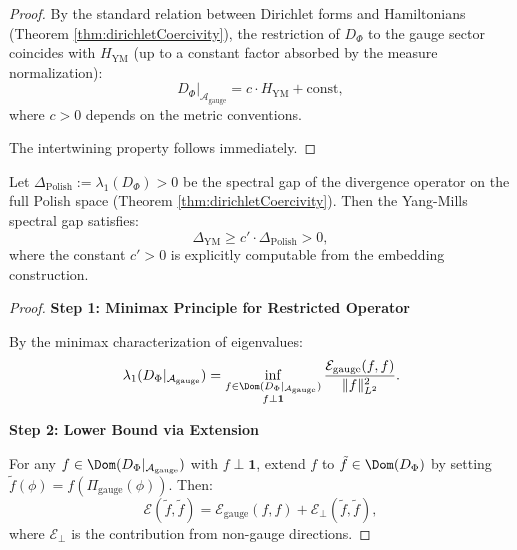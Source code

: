 \begin{theorem}
\begin{proof}
By the standard relation between Dirichlet forms and Hamiltonians (Theorem \ref{thm:dirichletCoercivity}), the restriction of $D_\Phi$ to the gauge sector coincides with $H_{\mathrm{YM}}$ (up to a constant factor absorbed by the measure normalization):
\begin{equation}
D_\Phi|_{\mathcal{A}_{\mathrm{gauge}}} = c \cdot H_{\mathrm{YM}} + \text{const},
\end{equation}
where $c > 0$ depends on the metric conventions.

The intertwining property follows immediately.

\end{proof}

\end{theorem}

\begin{theorem}
\label{thm:spectralGapInheritanceExplicit}

Let $\Delta_{\mathrm{Polish}} := \lambda_1(D_\Phi) > 0$ be the spectral gap of the divergence operator on the full Polish space (Theorem \ref{thm:dirichletCoercivity}). Then the Yang-Mills spectral gap satisfies:
\begin{equation}
\Delta_{\mathrm{YM}} \geq c' \cdot \Delta_{\mathrm{Polish}} > 0,
\label{eq:ymGapM3PrimeExplicit}
\end{equation}
where the constant $c' > 0$ is explicitly computable from the embedding construction.

\begin{proof}

\textbf{Step 1: Minimax Principle for Restricted Operator}

By the minimax characterization of eigenvalues:
\begin{equation}
\lambda_1(D_\Phi|_{\mathcal{A}_{\mathrm{gauge}}}) = \inf_{\substack{f \in \Dom(D_\Phi|_{\mathcal{A}_{\mathrm{gauge}}}) \\ f \perp \mathbf{1}}} \frac{\mathcal{E}_{\mathrm{gauge}}(f, f)}{\|f\|^2_{L^2}}.
\end{equation}

\textbf{Step 2: Lower Bound via Extension}

For any $f \in \Dom(D_\Phi|_{\mathcal{A}_{\mathrm{gauge}}})$ with $f \perp \mathbf{1}$, extend $f$ to $\tilde{f} \in \Dom(D_\Phi)$ by setting $\tilde{f}(\phi) = f(\Pi_{\mathrm{gauge}}(\phi))$. Then:
\begin{equation}
\mathcal{E}(\tilde{f}, \tilde{f}) = \mathcal{E}_{\mathrm{gauge}}(f, f) + \mathcal{E}_{\perp}(\tilde{f}, \tilde{f}),
\end{equation}
where $\mathcal{E}_{\perp}$ is the contribution from non-gauge directions.


\end{proof}
\end{theorem}
